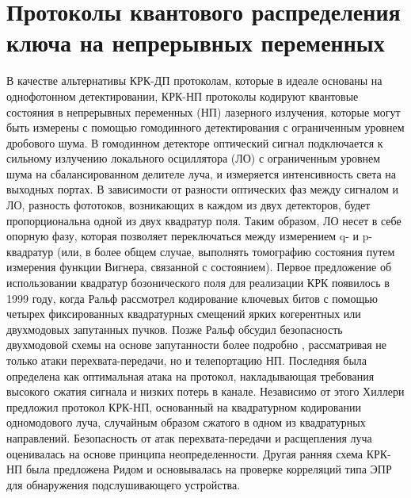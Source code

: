 \section{Протоколы квантового распределения ключа на непрерывных переменных}\label{sec:ch1/CV-QKD review}
В качестве альтернативы КРК-ДП протоколам, которые в идеале основаны на однофотонном детектировании, КРК-НП \cite{braunstein2005} протоколы кодируют квантовые состояния в непрерывных переменных (НП) лазерного излучения, которые могут быть измерены с помощью гомодинного детектирования с ограниченным уровнем дробового шума. В гомодинном детекторе оптический сигнал подключается к сильному излучению локального осциллятора (ЛО) с ограниченным уровнем шума на сбалансированном делителе луча, и измеряется интенсивность света на выходных портах. В зависимости от разности оптических фаз между сигналом и ЛО, разность фототоков, возникающих в каждом из двух детекторов, будет пропорциональна одной из двух квадратур поля. Таким образом, ЛО несет в себе опорную фазу, которая позволяет переключаться между измерением q- и p-квадратур (или, в более общем случае, выполнять томографию состояния путем измерения функции Вигнера, связанной с состоянием).
Первое предложение об использовании квадратур бозонического поля для реализации КРК появилось в 1999 году, когда Ральф \cite{ralph1999} рассмотрел кодирование ключевых битов с помощью четырех фиксированных квадратурных смещений ярких когерентных или двухмодовых запутанных пучков. Позже Ральф обсудил безопасность двухмодовой схемы на основе запутанности более подробно \cite{ralph2000}, рассматривая не только атаки перехвата-передачи, но и телепортацию НП. Последняя была определена как оптимальная атака на протокол, накладывающая требования высокого сжатия сигнала и низких потерь в канале. Независимо от этого Хиллери \cite{hillery2000} предложил протокол КРК-НП, основанный на квадратурном кодировании одномодового луча, случайным образом сжатого в одном из квадратурных направлений. Безопасность от атак перехвата-передачи и расщепления луча оценивалась на основе принципа неопределенности. Другая ранняя схема КРК-НП была предложена Ридом \cite{reid2000} и основывалась на проверке корреляций типа ЭПР для обнаружения подслушивающего устройства.
